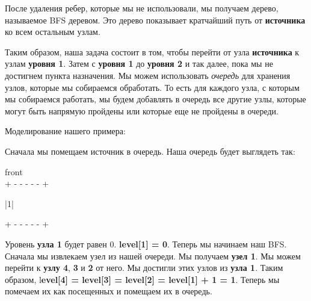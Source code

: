 После удаления ребер, которые мы не использовали, мы получаем дерево, называемое BFS деревом. Это дерево показывает кратчайший путь от \textbf{источника} ко всем остальным узлам.

\vspace{\baselineskip}

Таким образом, наша задача состоит в том, чтобы перейти от узла \textbf{источника} к узлам \textbf{уровня 1}. Затем с \textbf{уровня 1} до \textbf{уровня 2} и так далее, пока мы не достигнем пункта назначения. Мы можем использовать \textit{очередь} для хранения узлов, которые мы собираемся обработать. То есть для каждого узла, с которым мы собираемся работать, мы будем добавлять в очередь все другие узлы, которые могут быть напрямую пройдены или которые еще не пройдены в очереди.

\vspace{\baselineskip}

Моделирование нашего примера:

\vspace{\baselineskip}

Сначала мы помещаем источник в очередь. Наша очередь будет выглядеть так:

\vspace{\baselineskip}

\begin{tcolorbox}
\hspace{3mm}front \\
{\tiny{+ - - - - - +}}

\hspace{0.4mm}|\hspace{4.2mm}1\hspace{4.2mm}|

{\tiny{+ - - - - - +}}
\end{tcolorbox}

\vspace{\baselineskip}

Уровень \textbf{узла 1} будет равен 0. \textbf{level[1] = 0}. Теперь мы начинаем наш BFS. Сначала мы извлекаем узел из нашей очереди. Мы получаем \textbf{узел 1}. Мы можем перейти к \textbf{узлу 4}, \textbf{3} и \textbf{2} от него. Мы достигли этих узлов из \textbf{узла 1}. Таким образом, l\textbf{evel[4] = level[3] = level[2] = level[1] + 1 = 1}. Теперь мы помечаем их как посещенных и помещаем их в очередь.

\vspace{\baselineskip}


